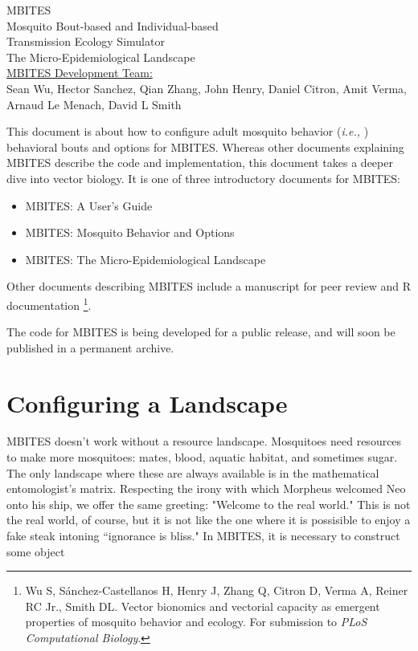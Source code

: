 \documentclass{article}
\newcommand{\ie}{{\em i.e., }}
\begin{document}


\begin{centering}
\Huge{MBITES}\\
\large{Mosquito Bout-based and Individual-based \\ Transmission Ecology Simulator}\\
\vspace{0.2in}
\huge{The Micro-Epidemiological Landscape}\\
\vspace{0.2in}
\large{\underline {MBITES Development Team:} \\ Sean Wu, Hector Sanchez, Qian Zhang, John Henry, Daniel Citron, Amit Verma, Arnaud Le Menach, David L Smith\\}

\end{centering}

\vspace{0.3in}

This document is about how to configure adult mosquito behavior (\ie) behavioral bouts and options for MBITES. Whereas other documents explaining MBITES describe the code and implementation, this document takes a deeper dive into vector biology. It is one of three introductory documents for MBITES: 
\begin{itemize}
\item MBITES: A User's Guide 
\item MBITES: Mosquito Behavior and Options
\item MBITES: The Micro-Epidemiological Landscape
\end{itemize}
Other documents describing MBITES include a manuscript for peer review and R documentation \footnote{Wu S, S{\' a}nchez-Castellanos H, Henry J, Zhang Q, Citron D, Verma A, Reiner RC Jr., Smith DL. Vector bionomics and vectorial capacity as emergent properties of mosquito behavior and ecology. For submission to {\em PLoS Computational Biology}.}. 

The code for MBITES is being developed for a public release, and will soon be published in a permanent archive.

\clearpage 

\section{Configuring a Landscape} 

MBITES doesn't work without a resource landscape. Mosquitoes need resources to make more mosquitoes: mates, blood, aquatic habitat, and sometimes sugar. The only landscape where these are always available is in the mathematical entomologist's matrix. Respecting the irony with which Morpheus welcomed Neo onto his ship, we offer the same greeting: "Welcome to the real world." This is not the real world, of course, but it is not like the one where it is possisible to enjoy a fake steak intoning ``ignorance is bliss." In MBITES, it is necessary to construct some object 
\end{document}
